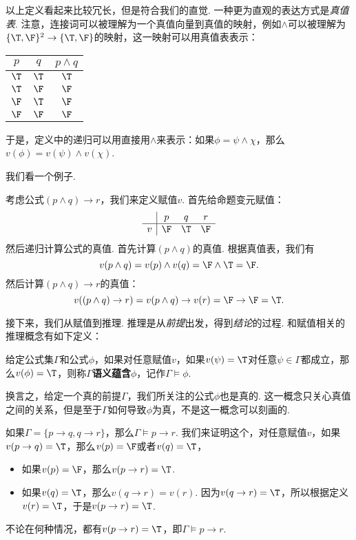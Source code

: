 以上定义看起来比较冗长，但是符合我们的直觉. 一种更为直观的表达方式是\emph{真值表}. 注意，连接词可以被理解为一个真值向量到真值的映射，例如$\wedge$可以被理解为$\{\T,\F\}^2\to\{\T,\F\}$的映射，这一映射可以用真值表表示：

\begin{center}
\begin{tabular}{cc|c}
    $p$ & $q$ & $p\wedge q$ \\
    \hline
    $\T$ & $\T$ & $\T$ \\
    $\T$ & $\F$ & $\F$ \\
    $\F$ & $\T$ & $\F$ \\
    $\F$ & $\F$ & $\F$ \\
\end{tabular}
\end{center}
于是，定义中的递归可以用直接用$\wedge$来表示：如果$\phi=\psi\wedge\chi$，那么$v(\phi)=v(\psi)\wedge v(\chi)$.

我们看一个例子. 

\begin{example}
考虑公式$(p\wedge q)\to r$，我们来定义赋值$v$. 首先给命题变元赋值：
\[\begin{array}{c|ccc}
    &p&q&r\\\hline
    v&\F&\T&\F\\
\end{array}\]
然后递归计算公式的真值. 首先计算$(p\wedge q)$的真值. 根据真值表，我们有
\[v(p\wedge q)=v(p)\wedge v(q)=\F\wedge\T=\F.\]
然后计算$(p\wedge q)\to r$的真值：
\[v((p\wedge q)\to r)=v(p\wedge q)\to v(r)=\F\to\F=\T.\]
\end{example}

接下来，我们从赋值到推理. 推理是从\emph{前提}出发，得到\emph{结论}的过程. 和赋值相关的推理概念有如下定义：

\begin{definition}[语义蕴含]
给定公式集$\Gamma$和公式$\phi$，如果对任意赋值$v$，如果$v(\psi)=\T$对任意$\psi\in\Gamma$都成立，那么$v(\phi)=\T$，则称$\Gamma$\textbf{语义蕴含}$\phi$，记作$\Gamma\vDash\phi$.
\end{definition}

换言之，给定一个真的前提$\Gamma$，我们所关注的公式$\phi$也是真的. 这一概念只关心真值之间的关系，但是至于$\Gamma$如何导致$\phi$为真，不是这一概念可以刻画的. 

\begin{example}\label{ex:semantic-implication}
如果$\Gamma=\{p\to q,q\to r\}$，那么$\Gamma\vDash p\to r$. 我们来证明这个，对任意赋值$v$，如果$v(p\to q)=\T$，那么$v(p)=\F$或者$v(q)=\T$，
\begin{itemize}
    \item 如果$v(p)=\F$，那么$v(p\to r)=\T$.
    \item 如果$v(q)=\T$，那么$v(q\to r)=v(r)$. 因为$v(q\to r)=\T$，所以根据定义$v(r)=\T$，于是$v(p\to r)=\T$.
\end{itemize}
不论在何种情况，都有$v(p\to r)=\T$，即$\Gamma\vDash p\to r$.
\end{example}


